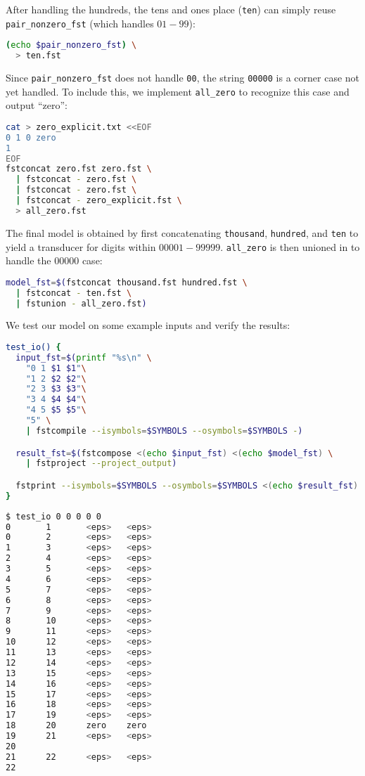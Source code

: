 \documentclass[a4paper,oneside,reqno]{amsart}
\begin{document}
\begin{enumerate}[label=\arabic*.]
    After handling the hundreds, the tens and ones place (\texttt{ten}) can
    simply reuse \texttt{pair\_nonzero\_fst} (which handles $01-99$):
    \begin{lstlisting}[language=bash]
(echo $pair_nonzero_fst) \
  > ten.fst
    \end{lstlisting}

    Since \texttt{pair\_nonzero\_fst} does not handle \texttt{00}, the string
    \texttt{00000} is a corner case not yet handled. To include this, we
    implement \texttt{all\_zero} to recognize this case and output ``zero'':
    \begin{lstlisting}[language=bash]
cat > zero_explicit.txt <<EOF
0 1 0 zero
1
EOF
fstconcat zero.fst zero.fst \
  | fstconcat - zero.fst \
  | fstconcat - zero.fst \
  | fstconcat - zero_explicit.fst \
  > all_zero.fst
    \end{lstlisting}

    The final model is obtained by first concatenating \texttt{thousand},
    \texttt{hundred}, and \texttt{ten} to yield a transducer for
    digits within $00001-99999$. \texttt{all\_zero} is then
    unioned in to handle the $00000$ case:
    \begin{lstlisting}[language=bash]
model_fst=$(fstconcat thousand.fst hundred.fst \
  | fstconcat - ten.fst \
  | fstunion - all_zero.fst)
    \end{lstlisting}

    We test our model on some example inputs and verify the results:
    \begin{lstlisting}[language=bash]
test_io() {
  input_fst=$(printf "%s\n" \
    "0 1 $1 $1"\
    "1 2 $2 $2"\
    "2 3 $3 $3"\
    "3 4 $4 $4"\
    "4 5 $5 $5"\
    "5" \
    | fstcompile --isymbols=$SYMBOLS --osymbols=$SYMBOLS -)

  result_fst=$(fstcompose <(echo $input_fst) <(echo $model_fst) \
    | fstproject --project_output)

  fstprint --isymbols=$SYMBOLS --osymbols=$SYMBOLS <(echo $result_fst)
}
    \end{lstlisting}

    \begin{lstlisting}[language=bash]
$ test_io 0 0 0 0 0
0       1       <eps>   <eps>
0       2       <eps>   <eps>
1       3       <eps>   <eps>
2       4       <eps>   <eps>
3       5       <eps>   <eps>
4       6       <eps>   <eps>
5       7       <eps>   <eps>
6       8       <eps>   <eps>
7       9       <eps>   <eps>
8       10      <eps>   <eps>
9       11      <eps>   <eps>
10      12      <eps>   <eps>
11      13      <eps>   <eps>
12      14      <eps>   <eps>
13      15      <eps>   <eps>
14      16      <eps>   <eps>
15      17      <eps>   <eps>
16      18      <eps>   <eps>
17      19      <eps>   <eps>
18      20      zero    zero
19      21      <eps>   <eps>
20
21      22      <eps>   <eps>
22
    \end{lstlisting}


\end{enumerate}
\end{document}
